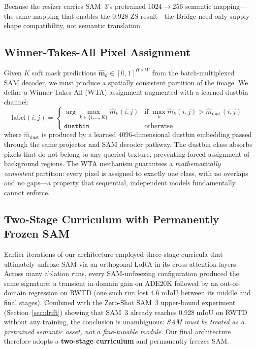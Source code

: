 \documentclass{article}
\begin{document}
Because the resizer carries SAM~3's pretrained $1024 \to 256$ semantic mapping---the same mapping that enables the 0.928 ZS result---the Bridge need only supply shape compatibility, not semantic translation.

\subsection{Winner-Takes-All Pixel Assignment}
\label{sec:wta}

Given $K$ soft mask predictions $\hat{\mathbf{m}}_k \in [0,1]^{H \times W}$ from the batch-multiplexed SAM decoder, we must produce a spatially consistent partition of the image. We define a Winner-Takes-All (WTA) assignment augmented with a learned dustbin channel:
\begin{equation}
    \mathrm{label}(i,j) = \begin{cases}
        \arg\max_{k \in \{1,\ldots,K\}} \hat{m}_k(i,j) & \text{if } \max_k \hat{m}_k(i,j) > \hat{m}_{\text{dust}}(i,j) \\
        \texttt{dustbin} & \text{otherwise}
    \end{cases}
\end{equation}
where $\hat{m}_{\text{dust}}$ is produced by a learned 4096-dimensional dustbin embedding passed through the same projector and SAM decoder pathway. The dustbin class absorbs pixels that do not belong to any queried texture, preventing forced assignment of background regions. The WTA mechanism guarantees a \emph{mathematically consistent} partition: every pixel is assigned to exactly one class, with no overlaps and no gaps---a property that sequential, independent models fundamentally cannot enforce.

\subsection{Two-Stage Curriculum with Permanently Frozen SAM}
\label{sec:curriculum}

Earlier iterations of our architecture employed three-stage curricula that ultimately unfroze SAM via an orthogonal LoRA in its cross-attention layers. Across many ablation runs, every SAM-unfreezing configuration produced the same signature: a transient in-domain gain on ADE20K followed by an out-of-domain regression on RWTD (one such run lost 4.6 mIoU between its middle and final stages). Combined with the Zero-Shot SAM~3 upper-bound experiment (Section~\ref{sec:drift}) showing that SAM~3 already reaches 0.928 mIoU on RWTD without any training, the conclusion is unambiguous: \emph{SAM must be treated as a pretrained semantic asset, not a fine-tunable module.} Our final architecture therefore adopts a \textbf{two-stage curriculum} and permanently freezes SAM.
\end{document}
